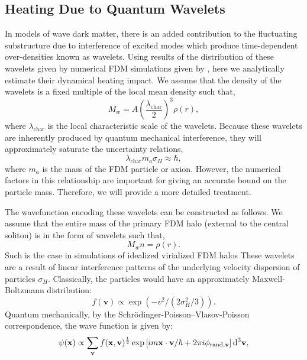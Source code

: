 \documentclass[usenatbib]{mnras}
\begin{document}
\subsection{Heating Due to Quantum Wavelets}

In models of wave dark matter, there is an added contribution to the fluctuating substructure due to interference of excited modes which produce time-dependent over-densities known as wavelets. Using results of the distribution of these wavelets given by numerical FDM simulations given by \cite{BECDM}, here we analytically estimate their dynamical heating impact. We assume that the density of the wavelets is a fixed multiple of the local mean density such that,
\begin{equation} \label{multiple_of_background}
M_w = A \left(\frac{\lambda_{\text{char}}}{2} \right)^3 \rho(r),
\end{equation}  
where $\lambda_{\text{char}}$ is the local characteristic scale of the wavelets. Because these wavelets are inherently produced by quantum mechanical interference, they will approximately saturate the uncertainty relations,
\begin{equation}
\lambda_{\text{char}} m_a \sigma_H \approx \hbar,
\end{equation}
where $m_a$ is the mass of the FDM particle or axion. However, the numerical factors in this relationship are important for giving an accurate bound on the particle mass. Therefore, we will provide a more detailed treatment. 
\par
The wavefunction encoding these wavelets can be constructed as follows. We assume that {\color{red} the} entire mass of the primary FDM halo (external to the central soliton) is in the form of wavelets such that,
\begin{equation} \label{const}
M_w n = \rho(r).
\end{equation}
Such is the case in simulations of idealized virialized FDM halos \citep{numerical-Schrodinger} These wavelets are a result of linear interference {\color{red} patterns} of the underlying velocity dispersion of particles $\sigma_H$. Classically, the particles would have an approximately Maxwell-Boltzmann distribution:
\begin{equation}
f(\mathbf{v}) \propto \exp\left(-v^2/(2\sigma_{H}^2/3)\right).
\end{equation}
Quantum mechanically, by the Schr\"{o}dinger-Poisson–Vlasov-Poisson correspondence, the wave function is given by:
\begin{equation} \label{phase_dist}
\psi(\mathbf{x}) \propto \sum_{\mathbf{v}} f(\mathbf{x},\mathbf{v})^{\frac{1}{2}} \exp{\left[i m \mathbf{x}\cdot\mathbf{v}/\hbar + 2\pi i \phi_{{\rm rand},\mathbf{v}} \right]}
\, \mathrm{d}^{3}{\mathbf{v}},
\end{equation}
\end{document}
